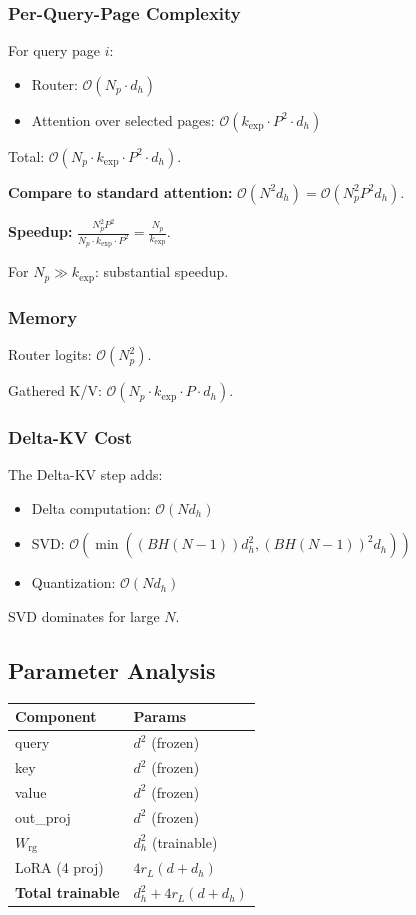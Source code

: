 \subsubsection{Per-Query-Page Complexity}

For query page $i$:
\begin{itemize}
\item Router: $\mathcal{O}(N_p \cdot d_h)$
\item Attention over selected pages: $\mathcal{O}(k_\text{exp} \cdot P^2 \cdot d_h)$

\end{itemize}
Total: $\mathcal{O}(N_p \cdot k_\text{exp} \cdot P^2 \cdot d_h)$.

\textbf{Compare to standard attention:} $\mathcal{O}(N^2 d_h) = \mathcal{O}(N_p^2 P^2 d_h)$.

\textbf{Speedup:} $\frac{N_p^2 P^2}{N_p \cdot k_\text{exp} \cdot P^2} = \frac{N_p}{k_\text{exp}}$.

For $N_p \gg k_\text{exp}$: substantial speedup.

\subsubsection{Memory}

Router logits: $\mathcal{O}(N_p^2)$.

Gathered K/V: $\mathcal{O}(N_p \cdot k_\text{exp} \cdot P \cdot d_h)$.

\subsubsection{Delta-KV Cost}

The Delta-KV step adds:
\begin{itemize}
\item Delta computation: $\mathcal{O}(N d_h)$
\item SVD: $\mathcal{O}(\min((BH(N-1)) d_h^2, (BH(N-1))^2 d_h))$
\item Quantization: $\mathcal{O}(N d_h)$

\end{itemize}
SVD dominates for large $N$.

\subsection{Parameter Analysis}

\begin{table}[H]
\centering
\small
\begin{tabular}{ll}
\toprule
\textbf{Component} & \textbf{Params} \\
\midrule
query & $d^2$ (frozen) \\
key & $d^2$ (frozen) \\
value & $d^2$ (frozen) \\
out\_proj & $d^2$ (frozen) \\
$W_\text{rg}$ & $d_h^2$ (trainable) \\
LoRA (4 proj) & $4 r_L (d + d_h)$ \\
\textbf{Total trainable} & $d_h^2 + 4 r_L (d + d_h)$ \\
\bottomrule
\end{tabular}
\end{table}

